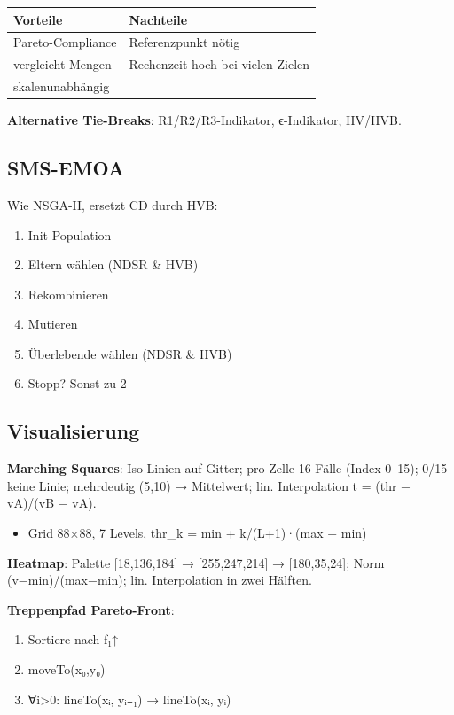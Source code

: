 \documentclass[11pt, a4paper]{article}
\begin{document}
{\small
\begin{tabularx}{\linewidth}{XX}
\hline
\rowcolor{tableheadbg}
{\color{white}\textbf{Vorteile}} & {\color{white}\textbf{Nachteile}} \\[2pt]
\hline
\endhead
\hline
\endfoot
Pareto-Compliance & Referenzpunkt nötig \\
vergleicht Mengen & Rechenzeit hoch bei vielen Zielen \\
skalenunabhängig &  \\
\end{tabularx}
}


\textbf{Alternative Tie-Breaks}: R1/R2/R3-Indikator, ϵ-Indikator, HV/HVB.



\subsection{SMS-EMOA}

Wie NSGA-II, ersetzt CD durch HVB:

\begin{enumerate}
  \item Init Population
  \item Eltern wählen (NDSR \& HVB)
  \item Rekombinieren
  \item Mutieren
  \item Überlebende wählen (NDSR \& HVB)
  \item Stopp? Sonst zu 2
\end{enumerate}


\subsection{Visualisierung}

\textbf{Marching Squares}: Iso-Linien auf Gitter; pro Zelle 16 Fälle (Index 0–15); 0/15 keine Linie; mehrdeutig (5,10) → Mittelwert; lin. Interpolation t = (thr − vA)/(vB − vA).

\begin{itemize}
  \item Grid 88×88, 7 Levels, thr\_k = min + k/(L+1)·(max − min)
\end{itemize}

\textbf{Heatmap}: Palette [18,136,184] → [255,247,214] → [180,35,24]; Norm (v−min)/(max−min); lin. Interpolation in zwei Hälften.


\textbf{Treppenpfad Pareto-Front}:

\begin{enumerate}
  \item Sortiere nach f₁↑
  \item moveTo(x₀,y₀)
  \item ∀i>0: lineTo(xᵢ, yᵢ₋₁) → lineTo(xᵢ, yᵢ)
\end{enumerate}
\end{document}

